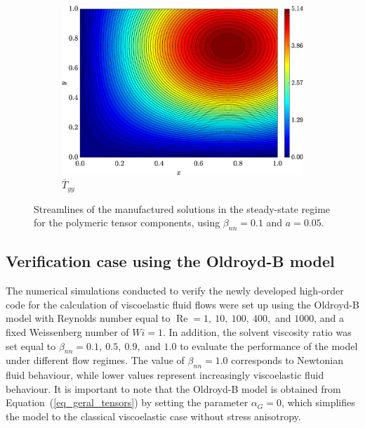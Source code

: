 \documentclass[preprint, 12pt]{elsarticle}
\begin{document}
\begin{figure}[H]
    \begin{subfigure}[b]{.46\textwidth}
        \includegraphics[width=\textwidth]{Exact_Map_NormErr_2nd_Betann_0.1_Re_1_Wi_1_epsilon_0_xi_0_alphaG_0_Dt_1e-06_at_0.05_tipsim_1_MMS_12_Tyy.eps}
        \caption{$\overline{T}_{yy}$}
        \label{fig_solexatyystreamlineCase1}
    \end{subfigure}
    \vspace{0.02cm}
    \caption{Streamlines of the manufactured solutions in the steady-state regime for the polymeric tensor components, using $\beta_{nn}=0.1$ and $a = 0.05$.\label{fig_Txxxyyy_m_u_sol_num_case1streamline2}}
\end{figure}

\subsection{Verification case using the Oldroyd-B model}\label{subsec_oldroydb}

The numerical simulations conducted to verify the newly developed high-order code for the calculation of viscoelastic fluid flows were set up using the Oldroyd-B model with Reynolds number equal to $\operatorname{Re}=1,\ 10,\ 100,\ 400,$ and $1000$, and a fixed Weissenberg number of $Wi=1$. In addition, the solvent viscosity ratio was set equal to $\beta_{nn} = 0.1,\ 0.5,\ 0.9,$ and $1.0$ to evaluate the performance of the model under different flow regimes. The value of $\beta_{nn} = 1.0$ corresponds to Newtonian fluid behaviour, while lower values represent increasingly viscoelastic fluid behaviour. It is important to note that the Oldroyd-B model is obtained from Equation~(\ref{eq_geral_tensors}) by setting the parameter $\alpha_{G} = 0$, which simplifies the model to the classical viscoelastic case without stress anisotropy.
\end{document}
